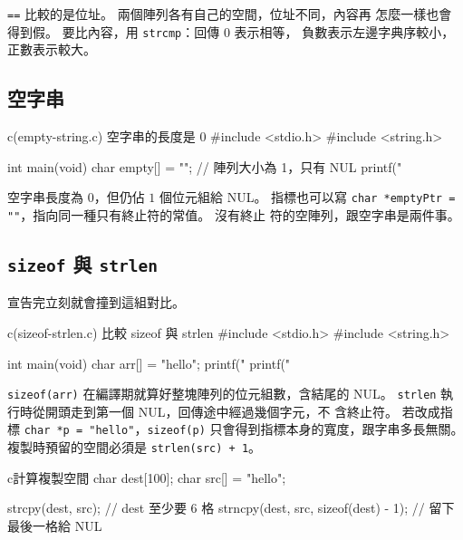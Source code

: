 \texttt{==} 比較的是位址。 兩個陣列各有自己的空間，位址不同，內容再
怎麼一樣也會得到假。 要比內容，用 \texttt{strcmp}：回傳 $0$ 表示相等，
負數表示左邊字典序較小，正數表示較大。

\subsection{空字串}

\begin{example}{c}{(empty-string.c) 空字串的長度是 0}
#include <stdio.h>
#include <string.h>

int main(void) {
    char empty[] = "";         // 陣列大小為 1，只有 NUL
    printf("%
}
\end{example}


空字串長度為 $0$，但仍佔 $1$ 個位元組給 NUL。 指標也可以寫
\texttt{char *emptyPtr = ""}，指向同一種只有終止符的常值。 沒有終止
符的空陣列，跟空字串是兩件事。

\subsection{\texttt{sizeof} 與 \texttt{strlen}}

宣告完立刻就會撞到這組對比。

\begin{example}{c}{(sizeof-strlen.c) 比較 sizeof 與 strlen}
#include <stdio.h>
#include <string.h>

int main(void) {
    char arr[] = "hello";
    printf("%
    printf("%
}
\end{example}


\texttt{sizeof(arr)} 在編譯期就算好整塊陣列的位元組數，含結尾的 NUL。
\texttt{strlen} 執行時從開頭走到第一個 NUL，回傳途中經過幾個字元，不
含終止符。 若改成指標 \texttt{char *p = "hello"}，\texttt{sizeof(p)}
只會得到指標本身的寬度，跟字串多長無關。 複製時預留的空間必須是
\texttt{strlen(src) + 1}。

\begin{code}{c}{計算複製空間}
char dest[100];
char src[] = "hello";

strcpy(dest, src);                    // dest 至少要 6 格
strncpy(dest, src, sizeof(dest) - 1); // 留下最後一格給 NUL
\end{code}

